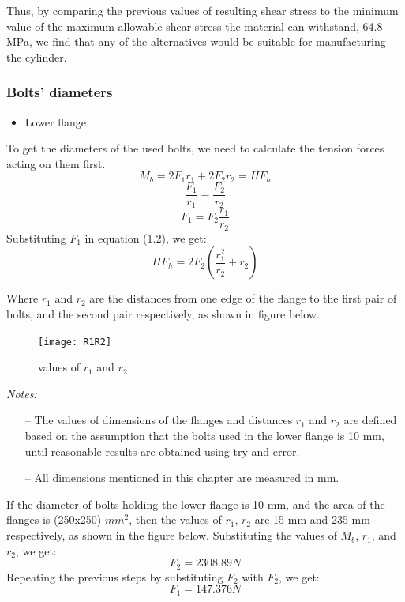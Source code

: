 Thus, by comparing the previous values of resulting shear stress to the minimum value of the maximum allowable shear stress the material can withstand, 64.8 MPa, we find that any of the alternatives would be suitable for manufacturing the cylinder.

\bigskip

\subsubsection{Bolts’ diameters}
\begin{itemize}
	\item Lower flange
\end{itemize}

To get the diameters of the used bolts, we need to calculate the tension forces acting on them first. 
\begin{equation}
M_{b} = 2 F_{1} r_{1} + 2 F_{2} r_{2} = H F_{h}
\end{equation}
$$\frac{F_{1}}{r_{1}} = \frac{F_{2}}{r_{2}}$$
$$ F_{1} = F_{2} \frac{r_{1}}{r_{2}}$$
Substituting $F_{1}$ in equation (1.2), we get:
\begin{equation}
H F_{h} = 2 F_{2} (\frac{r_{1}^{2}}{r_{2}} + r_{2})
\end{equation}

Where $r_{1}$ and $r_{2}$ are the distances from one edge of the flange to the first pair of bolts, and the second pair respectively, as shown in figure below.
\begin{figure}[H]
\begin{center}
	\texttt{[image: R1R2]}
	\caption{values of $r_{1}$ and $r_{2}$}
\end{center}	
\end{figure}

\textit{Notes:} 
\begin{itemize}	
\item[--]  The values of dimensions of the flanges and distances $r_{1}$ and $r_{2}$ are defined based on the assumption that the bolts used in the lower flange is 10 mm, until reasonable results are obtained using try and error.
\item[--] All dimensions mentioned in this chapter are measured in mm.
\end{itemize}



If the diameter of bolts holding the lower flange is 10 mm, and the area of the flanges is (250x250) $mm^{2}$, then the values of $r_{1}$, $r_{2}$ are 15 mm and 235 mm respectively, as shown in the figure below.
\newline Substituting the values of $M_{b}$, $r_{1}$, and $r_{2}$, we get:
$$ F_{2} = 2308.89 N $$
Repeating the previous steps by substituting $F_{2}$ with $F_{2}$, we get:
$$ F_{1} = 147.376 N $$

